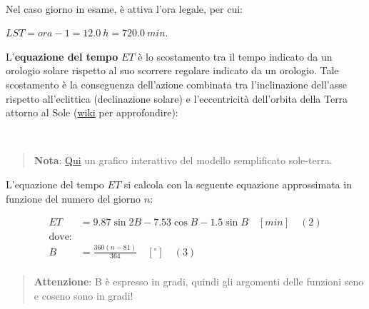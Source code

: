 \documentclass[11pt]{article}
\begin{document}
            
    
    \begin{center}
    \end{center}
    { \hspace*{\fill} \\}
    

    Nel caso giorno in esame, è attiva l'ora legale, per cui:
 
            
    
    \(LST = ora - 1 = 12.0 \ h = 720.0 \ min\).

    

    L'\textbf{equazione del tempo} \(ET\) è lo scostamento tra il tempo
indicato da un orologio solare rispetto al suo scorrere regolare
indicato da un orologio. Tale scostamento è la conseguenza dell'azione
combinata tra l'inclinazione dell'asse rispetto all'eclittica
(declinazione solare) e l'eccentricità dell'orbita della Terra attorno
al Sole (\href{https://it.wikipedia.org/wiki/Equazione_del_tempo}{wiki}
per approfondire):
 
            
    
    \begin{center}
    \end{center}
    { \hspace*{\fill} \\}
    

    \begin{quote}
\textbf{Nota}: \href{https://www.geogebra.org/m/nwhgeqkz}{Qui} un
grafico interattivo del modello semplificato sole-terra.
\end{quote}

    L'equazione del tempo \(ET\) si calcola con la seguente equazione
approssimata in funzione del numero del giorno \(n\):

    \[\begin{align*}
ET &= 9.87\sin 2B -7.53\cos B -1.5\sin B  \quad [min] \quad (2)\\
\text{dove:}\\
B &= \frac{360(n-81)}{364} \quad [^{{\circ}}] \quad (3)\\
\end{align*}\]

    \begin{quote}
\textbf{Attenzione}: B è espresso in gradi, quindi gli argomenti delle
funzioni seno e coseno sono in gradi!
\end{quote}
\end{document}
